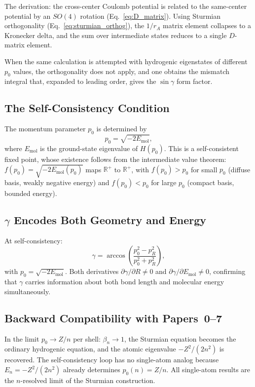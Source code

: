 \documentclass[aps,pra,twocolumn,superscriptaddress,longbibliography]{revtex4-2}
\begin{document}
The derivation: the cross-center Coulomb potential is related to the
same-center potential by an $SO(4)$ rotation (Eq.~\eqref{eq:D_matrix}).
Using Sturmian orthogonality (Eq.~\eqref{eq:sturmian_orthog}), the
$1/r_A$ matrix element collapses to a Kronecker delta, and the sum
over intermediate states reduces to a single $D$-matrix element.

When the same calculation is attempted with hydrogenic eigenstates of
different $p_0$ values, the orthogonality does not apply, and one
obtains the mismatch integral that, expanded to leading order, gives
the $\sin\gamma$ form factor.

\subsection{The Self-Consistency Condition}

The momentum parameter $p_0$ is determined by
\begin{equation}
p_0 = \sqrt{-2E_{\text{mol}}},
\label{eq:self_consistency}
\end{equation}
where $E_{\text{mol}}$ is the ground-state eigenvalue of $H(p_0)$.
This is a self-consistent fixed point, whose existence follows from
the intermediate value theorem: $f(p_0) = \sqrt{-2E_{\text{mol}}(p_0)}$
maps $\mathbb{R}^+$ to $\mathbb{R}^+$, with $f(p_0) > p_0$ for
small $p_0$ (diffuse basis, weakly negative energy) and $f(p_0) < p_0$
for large $p_0$ (compact basis, bounded energy).

\subsection{$\gamma$ Encodes Both Geometry and Energy}

At self-consistency:
\begin{equation}
\gamma = \arccos\!\left(\frac{p_0^2 - p_R^2}{p_0^2 + p_R^2}\right),
\label{eq:gamma_sc}
\end{equation}
with $p_0 = \sqrt{-2E_{\text{mol}}}$.  Both derivatives
$\partial\gamma/\partial R \neq 0$ and
$\partial\gamma/\partial E_{\text{mol}} \neq 0$, confirming that
$\gamma$ carries information about both bond length and molecular
energy simultaneously.

\subsection{Backward Compatibility with Papers~0--7}

In the limit $p_0 \to Z/n$ per shell: $\beta_n \to 1$, the Sturmian
equation becomes the ordinary hydrogenic equation, and the atomic
eigenvalue $-Z^2/(2n^2)$ is recovered.  The self-consistency loop has
no single-atom analog because $E_n = -Z^2/(2n^2)$ already determines
$p_0(n) = Z/n$.  All single-atom results are the $n$-resolved limit
of the Sturmian construction.
\end{document}

